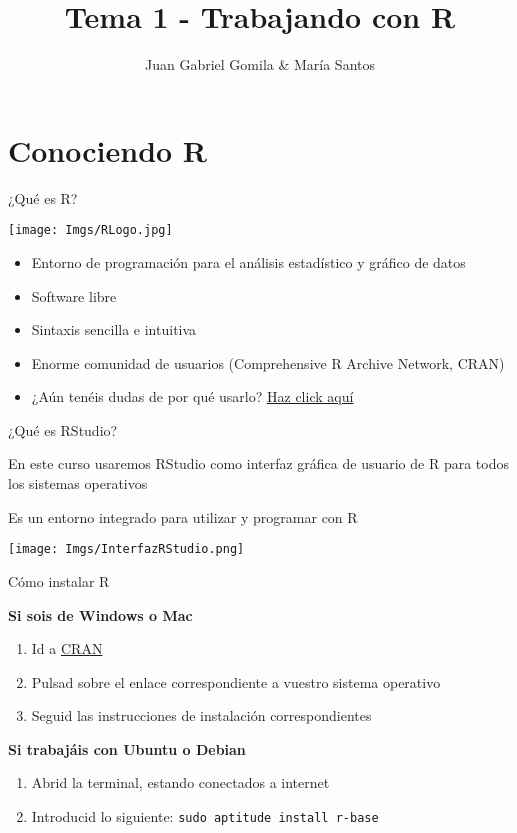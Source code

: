 \documentclass[
  ignorenonframetext,
]{beamer}
\title{Tema 1 - Trabajando con R}
\author{Juan Gabriel Gomila \& María Santos}
\date{}
\providecommand{\tightlist}{%
  \setlength{\itemsep}{0pt}\setlength{\parskip}{0pt}}
\begin{document}
\frame{\titlepage}

\hypertarget{conociendo-r}{%
\section{Conociendo R}\label{conociendo-r}}

\begin{frame}{¿Qué es R?}
\protect\hypertarget{quuxe9-es-r}{}

\texttt{[image: Imgs/RLogo.jpg]}

\begin{itemize}
\tightlist
\item
  Entorno de programación para el análisis estadístico y gráfico de
  datos
\item
  Software libre
\item
  Sintaxis sencilla e intuitiva
\item
  Enorme comunidad de usuarios (Comprehensive R Archive Network, CRAN)
\item
  ¿Aún tenéis dudas de por qué usarlo?
  \href{https://www.r-bloggers.com/why-use-r-five-reasons/}{Haz click
  aquí}
\end{itemize}

\end{frame}

\begin{frame}{¿Qué es RStudio?}
\protect\hypertarget{quuxe9-es-rstudio}{}

En este curso usaremos RStudio como interfaz gráfica de usuario de R
para todos los sistemas operativos

Es un entorno integrado para utilizar y programar con R

\texttt{[image: Imgs/InterfazRStudio.png]}

\end{frame}

\begin{frame}[fragile]{Cómo instalar R}
\protect\hypertarget{cuxf3mo-instalar-r}{}

\textbf{Si sois de Windows o Mac}

\begin{enumerate}
\tightlist
\item
  Id a \href{http://cran.r-project.org/}{CRAN}
\item
  Pulsad sobre el enlace correspondiente a vuestro sistema operativo
\item
  Seguid las instrucciones de instalación correspondientes
\end{enumerate}

\textbf{Si trabajáis con Ubuntu o Debian}

\begin{enumerate}
\tightlist
\item
  Abrid la terminal, estando conectados a internet
\item
  Introducid lo siguiente: \texttt{sudo\ aptitude\ install\ r-base}
\end{enumerate}

\end{frame}
\end{document}

